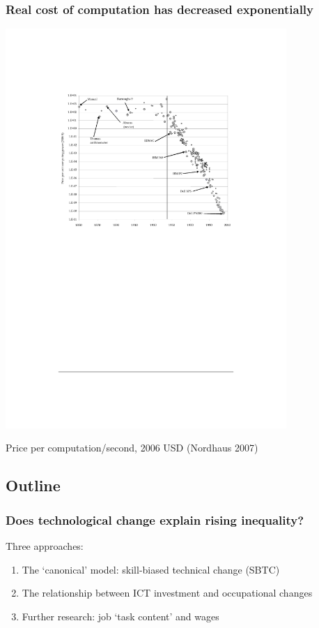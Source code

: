 \documentclass[red]{beamer}
\begin{document}
\begin{frame}[c]
\frametitle{Real cost of computation has decreased exponentially}
\begin{center}
  \includegraphics[width=0.8\textwidth]{slides_fig/nordhaus_2007.pdf}
\end{center}
Price per computation/second, 2006 USD (Nordhaus 2007)
\end{frame}

\subsection{Outline}
\begin{frame}[c]
\frametitle{Does technological change explain rising inequality?}
Three approaches:
\begin{enumerate}
\vfill\item The `canonical' model: skill-biased technical change (SBTC)
\pause
\vfill\item The relationship between ICT investment and occupational changes
\pause
\vfill\item Further research: job `task content' and wages
\end{enumerate}
\end{frame}
\end{document}
